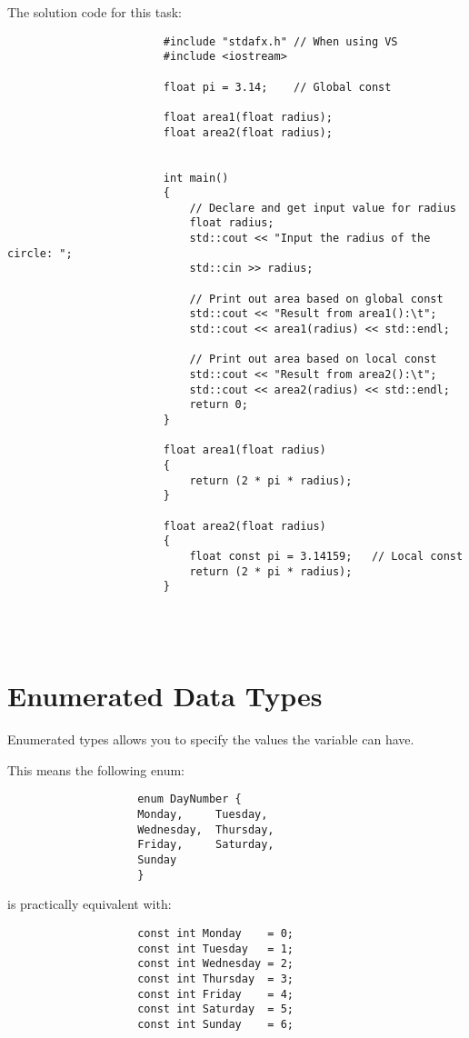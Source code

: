 \documentclass{report}
\begin{document}
				
				\begin{minipage}{\linewidth}
					The solution code for this task:
					\begin{lstlisting}
						#include "stdafx.h"	// When using VS
						#include <iostream>
						
						float pi = 3.14;	// Global const
						
						float area1(float radius);
						float area2(float radius);
						
						
						int main()
						{
							// Declare and get input value for radius
							float radius;
							std::cout << "Input the radius of the circle: ";
							std::cin >> radius;
							
							// Print out area based on global const
							std::cout << "Result from area1():\t";
							std::cout << area1(radius) << std::endl;
							
							// Print out area based on local const
							std::cout << "Result from area2():\t";
							std::cout << area2(radius) << std::endl;
							return 0;
						}
						
						float area1(float radius)
						{
							return (2 * pi * radius);
						}
						
						float area2(float radius)
						{
							float const pi = 3.14159;	// Local const
							return (2 * pi * radius);
						}
					\end{lstlisting}
				\end{minipage}
				\\ \\
		
		
		
		\section{Enumerated Data Types}
			Enumerated types allows you to specify the values the variable can have. \\
			
			\begin{minipage}{\linewidth}
				This means the following enum:
				\begin{lstlisting}
					enum DayNumber {
					Monday, 	Tuesday,
					Wednesday, 	Thursday,
					Friday, 	Saturday,
					Sunday
					}
				\end{lstlisting}
			\end{minipage}
			
			\begin{minipage}{\linewidth}
				is practically equivalent with:
				\begin{lstlisting}
					const int Monday	= 0;
					const int Tuesday	= 1;
					const int Wednesday	= 2;
					const int Thursday	= 3;
					const int Friday	= 4;
					const int Saturday	= 5;
					const int Sunday	= 6;
				\end{lstlisting}
			\end{minipage}
			\\ \\
			
\end{document}
